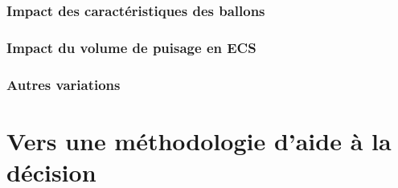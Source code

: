 \subsubsection{Impact des caractéristiques des ballons} %
\label{ssub:impact_des_caracteristiques_des_ballons}



\subsubsection{Impact du volume de puisage en ECS} %
\label{ssub:impact_du_volume_de_puisage_en_ecs}



\subsubsection{Autres variations} %
\label{ssub:autres_variations}







\section{Vers une méthodologie d’aide à la décision} %
\label{sec:vers_une_methodologie_d_aide_a_la_decision}

























